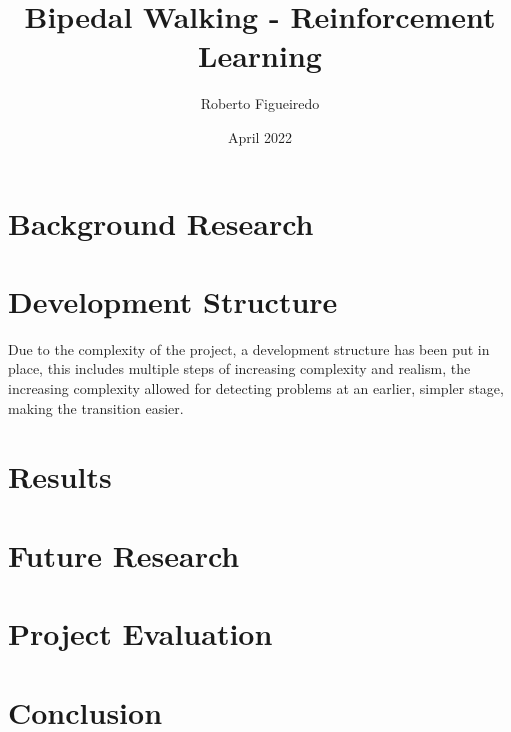 \documentclass[12pt, a4paper]{report}
\title{Bipedal Walking - Reinforcement Learning}
\author{Roberto Figueiredo}
\date{April 2022}
\begin{document}
\begin{titlepage}
    \maketitle 
    \thispagestyle{empty}
\end{titlepage}





\pagebreak
\tableofcontents
\pagebreak





\chapter{Background Research}

    

\chapter{Development Structure}
    Due to the complexity of the project, a development structure has been put in place, 
    this includes multiple steps of increasing complexity and realism, 
    the increasing complexity allowed for detecting problems at an earlier, simpler stage, making the transition easier.

    
    

\chapter{Results}
    

\chapter{Future Research}
    

\chapter{Project Evaluation}
    

\chapter{Conclusion}
    




    



\end{document}
